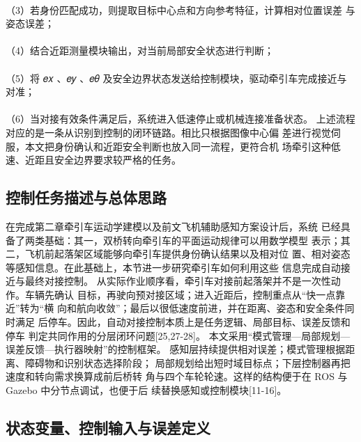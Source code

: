 \paragraph{} （3）若身份匹配成功，则提取目标中心点和方向参考特征，计算相对位置误差
与姿态误差；
\paragraph{} （4）结合近距测量模块输出，对当前局部安全状态进行判断；
\paragraph{} （5）将 𝑒𝑥 、𝑒𝑦 、𝑒𝜃 及安全边界状态发送给控制模块，驱动牵引车完成接近与
对准；







\paragraph{} （6）当对接有效条件满足后，系统进入低速停止或机械连接准备状态。
上述流程对应的是一条从识别到控制的闭环链路。相比只根据图像中心偏
差进行视觉伺服，本文把身份确认和近距安全判断也放入同一流程，更符合机
场牵引这种低速、近距且安全边界要求较严格的任务。
\subsection{控制任务描述与总体思路}
在完成第二章牵引车运动学建模以及前文飞机辅助感知方案设计后，系统
已经具备了两类基础：其一，双桥转向牵引车的平面运动规律可以用数学模型
表示；其二，飞机前起落架区域能够向牵引车提供身份确认结果以及相对位
置、相对姿态等感知信息。在此基础上，本节进一步研究牵引车如何利用这些
信息完成自动接近与最终对接控制。
从实际作业顺序看，牵引车对接前起落架并不是一次性动作。车辆先确认
目标，再驶向预对接区域；进入近距后，控制重点从“快一点靠近”转为“横
向和航向收敛”；最后以很低速度前进，并在距离、姿态和安全条件同时满足
后停车。因此，自动对接控制本质上是任务逻辑、局部目标、误差反馈和停车
判定共同作用的分层闭环问题[25,27-28]。
本文采用“模式管理—局部规划—误差反馈—执行器映射”的控制框架。
感知层持续提供相对误差；模式管理根据距离、障碍物和识别状态选择阶段；
局部规划给出短时域目标点；下层控制器再把速度和转向需求换算成前后桥转
角与四个车轮轮速。这样的结构便于在 ROS 与 Gazebo 中分节点调试，也便于后
续替换感知或控制模块[11-16]。
\subsection{状态变量、控制输入与误差定义}
